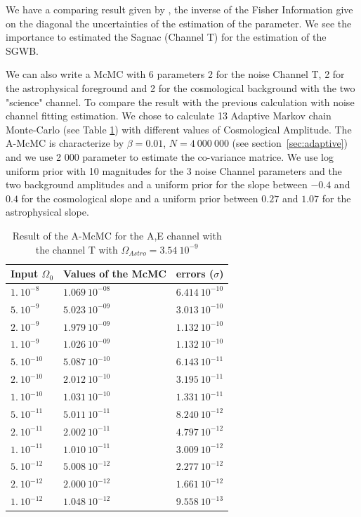 \documentclass[a4paper,12pt]{article}
\begin{document}
We have a comparing result given by \cite{PhysRevD.100.104055}, the inverse of the Fisher Information give on the diagonal the uncertainties of the estimation of the parameter. We see the importance to estimated the Sagnac (Channel T) for the estimation of the SGWB.  

We can also write a McMC with 6 parameters 2 for the noise Channel T, 2 for the astrophysical foreground and 2 for the cosmological background with the two "science" channel. To compare the result with the previous calculation with noise channel fitting estimation. We chose to calculate 13 Adaptive Markov chain Monte-Carlo (see Table \ref{table:resultA+E+T}) with different values of Cosmological Amplitude.  The A-McMC is characterize by $\beta = 0.01$, $N = 4 \ 000 \ 000$ (see section~\ref{sec:adaptive}) and we use 2 000 parameter to estimate the co-variance matrice. We use log uniform prior with 10 magnitudes for the 3 noise Channel parameters and the two background amplitudes and a uniform prior for the slope between $-0.4$ and $0.4$ for the cosmological slope and a uniform prior between $0.27$ and $1.07$ for the astrophysical slope. 

\begin{table}[H]
\begin{center}
\begin{tabular}{|l|l|l|}
\hline
Input $\Omega_0$    & Values of the McMC     & errors ($\sigma$)    \\ \hline
$1. \ 10^{-8}$      & $1.069 \ 10^{-08}$     & $6.414 \ 10^{-10}$   \\ \hline
$5. \ 10^{-9}$      & $5.023 \ 10^{-09}$     & $3.013 \ 10^{-10}$   \\ \hline
$2. \ 10^{-9}$      & $1.979 \ 10^{-09}$     & $1.132 \ 10^{-10}$   \\ \hline
$1. \ 10^{-9}$      & $1.026 \ 10^{-09}$     & $1.132 \ 10^{-10}$   \\ \hline
$5. \ 10^{-10}$     & $5.087 \ 10^{-10}$     & $6.143 \ 10^{-11}$   \\ \hline
$2. \ 10^{-10}$     & $2.012 \ 10^{-10}$     & $3.195 \ 10^{-11}$   \\ \hline
$1. \ 10^{-10}$     & $1.031 \ 10^{-10}$     & $1.331 \ 10^{-11}$   \\ \hline
$5. \ 10^{-11}$     & $5.011 \ 10^{-11}$     & $8.240 \ 10^{-12}$   \\ \hline
$2. \ 10^{-11}$     & $2.002 \ 10^{-11}$     & $4.797 \ 10^{-12}$   \\ \hline
$1. \ 10^{-11}$     & $1.010 \ 10^{-11}$     & $3.009 \ 10^{-12}$   \\ \hline
$5. \ 10^{-12}$     & $5.008 \ 10^{-12}$     & $2.277 \ 10^{-12}$   \\ \hline
$2. \ 10^{-12}$     & $2.000 \ 10^{-12}$     & $1.661 \ 10^{-12}$   \\ \hline
$1. \ 10^{-12}$     & $1.048 \ 10^{-12}$     & $9.558 \ 10^{-13}$   \\ \hline
\end{tabular}
\end{center}
\caption{Result of the A-McMC for the A,E channel with the channel T with $\Omega_{Astro} = 3.54 \ 10^{-9}$}
\label{table:resultA+E+T}
\end{table}
\end{document}
